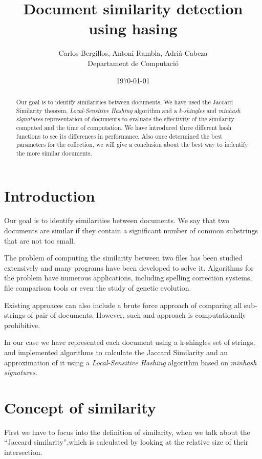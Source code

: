 \documentclass[12pt]{article}
\author{Carlos Bergillos, Antoni Rambla, Adrià Cabeza\\ Departament de Computació}
\title{Document similarity detection using hasing }
\date{\today}
\begin{document}
  \maketitle  

  \vspace{2cm}
	\begin{abstract}

Our goal is to identify similarities between documents. We have used the Jaccard Similarity theorem,  \textit{Local-Sensitive Hashing} algorithm
 and a \textit{k-shingles} and \textit{minhash signatures} representation of documents to evaluate the effectivity of the similarity computed and the time of computation. We have introduced three different hash functions to see its differences in performance.  Also  once determined the best parameters for the collection, we will give a conclusion about the best way to indentify the more similar documents. 
\end{abstract}

\newpage
\tableofcontents
\newpage

\section{Introduction}

Our goal is to identify similarities between documents. We say that two documents are similar if they contain a significant number of common substrings that are not too small. 

The problem of computing the similarity between two files has been studied extensively and many programs have been developed to solve it. Algorithms for the problem have numerous applications, including spelling correction systems, file comparison tools or even the study of genetic evolution.

 Existing approaces can also include a brute force approach of comparing all sub-strings of pair of documents. However, such and approach is computationally prohibitive. 

 In our case we have represented each document using a k-shingles set of strings, and implemented algorithms to calculate the Jaccard Similarity and an approximation of it using a \textit{Local-Sensitive Hashing} algorithm
 based on \textit{minhash signatures}.


 
\section{Concept of similarity}
First we have to focus into the definition of similarity, when we talk about the ``Jaccard similarity'',which is calculated by looking at the relative size of their intersection. 
\end{document}
